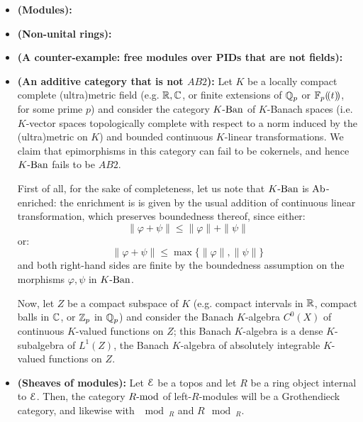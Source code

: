                 \begin{example} \label{examples: AB_categories}
                    \noindent
                    \begin{itemize}
                        \item \textbf{(Modules):}
                        \item \textbf{(Non-unital rings):}
                        \item \textbf{(A counter-example: free modules over PIDs that are not fields):}
                        \item \textbf{(An additive category that is not $AB2$):} Let $K$ be a locally compact complete (ultra)metric field (e.g. $\R, \bbC$, or finite extensions of $\Q_p$ or $\F_p(\!(t)\!)$, for some prime $p$) and consider the category $K\Ban$ of $K$-Banach spaces (i.e. $K$-vector spaces topologically complete with respect to a norm induced by the (ultra)metric on $K$) and bounded continuous $K$-linear transformations. We claim that epimorphisms in this category can fail to be cokernels, and hence $K\Ban$ fails to be $AB2$.
                        
                        First of all, for the sake of completeness, let us note that $K\Ban$ is $\Ab$-enriched: the enrichment is is given by the usual addition of continuous linear transformation, which preserves boundedness thereof, since either:
                            $$\|\varphi + \psi\| \leq \|\varphi\| + \|\psi\|$$
                        or:
                            $$\|\varphi + \psi\| \leq \max\{\|\varphi\|, \|\psi\|\}$$
                        and both right-hand sides are finite by the boundedness assumption on the morphisms $\varphi, \psi$ in $K\Ban$.
                        
                        Now, let $Z$ be a compact subspace of $K$ (e.g. compact intervals in $\R$, compact balls in $\bbC$, or $\Z_p$ in $\Q_p$) and consider the Banach $K$-algebra $C^0(X)$ of continuous $K$-valued functions on $Z$; this Banach $K$-algebra is a dense $K$-subalgebra of $L^1(Z)$, the Banach $K$-algebra of absolutely integrable $K$-valued functions on $Z$.
                        \item \textbf{(Sheaves of modules):} Let $\E$ be a topos and let $R$ be a ring object internal to $\E$. Then, the category $R\mod$ of left-$R$-modules will be a Grothendieck category, and likewise with $\mod_R$ and $R\mod_R$.
                    \end{itemize}
                \end{example}
                
